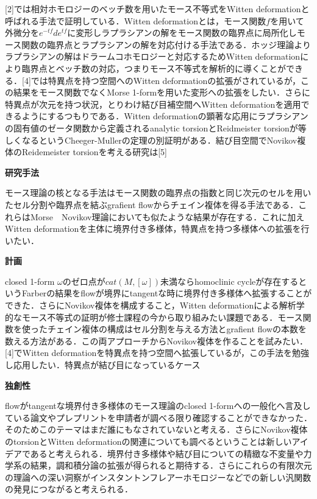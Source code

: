 \documentclass[11pt,a4j,dvipdfmx]{jarticle} 					%
\newcommand{\研究課題名}{象の卵}
\newcommand{\研究機関名}{京都大学}
\newcommand{\研究代表者氏名}{福士謙二}
\begin{document}
[2]では相対ホモロジーのベッチ数を用いたモース不等式をWitten deformationと呼ばれる手法で証明している．Witten deformationとは，モース関数$f$を用いて外微分を$e^{-tf}de^{tf}$に変形しラプラシアンの解をモース関数の臨界点に局所化しモース関数の臨界点とラプラシアンの解を対応付ける手法である．ホッジ理論よりラプラシアンの解はドラームコホモロジーと対応するためWitten deformationにより臨界点とベッチ数の対応，つまりモース不等式を解析的に導くことができる．[4]では特異点を持つ空間へのWitten deformationの拡張がされているが，この結果をモース関数でなくMorse 1-formを用いた変形への拡張をしたい．さらに特異点が次元を持つ状況，とりわけ結び目補空間へWitten deformationを適用できるようにするつもりである．Witten deformationの顕著な応用にラプラシアンの固有値のゼータ関数から定義されるanalytic torsionとReidmeister torsionが等しくなるというCheeger-Mullerの定理の別証明がある．結び目空間でNovikov複体のReidemeister torsionを考える研究は[5]



\noindent
\textbf{研究手法}

モース理論の核となる手法はモース関数の臨界点の指数と同じ次元のセルを用いたセル分割や臨界点を結ぶgrafient flowからチェイン複体を得る手法である．これらはMorse　Novikov理論においても似たような結果が存在する．これに加えWitten deformationを主体に境界付き多様体，特異点を持つ多様体への拡張を行いたい．

\noindent
\textbf{計画}

closed 1-form $\omega$のゼロ点が$cat(M,[\omega])$未満ならhomoclinic cycleが存在するというFarberの結果をflowが境界にtangentな時に境界付き多様体へ拡張することができた．さらにNovikov複体を構成すること，Witten deformationによる解析学的なモース不等式の証明が修士課程の今から取り組みたい課題である．モース関数を使ったチェイン複体の構成はセル分割を与える方法とgrafient flowの本数を数える方法がある．この両アプローチからNovikov複体を作ることを試みたい．[4]でWitten deformationを特異点を持つ空間へ拡張しているが，この手法を勉強し応用したい．特異点が結び目になっているケース



\noindent
\textbf{独創性}

flowがtangentな境界付き多様体のモース理論のclosed 1-formへの一般化へ言及している論文やプレプリントを申請者が調べる限り確認することができなかった．そのためこのテーマはまだ誰にもなされていないと考える．さらにNovikov複体のtorsionとWitten deformationの関連についても調べるということは新しいアイデアであると考えられる．境界付き多様体や結び目についての精緻な不変量や力学系の結果，調和積分論の拡張が得られると期待する．さらにこれらの有限次元の理論への深い洞察がインスタントンフレアーホモロジーなどでの新しい汎関数の発見につながると考えられる．
\end{document}
